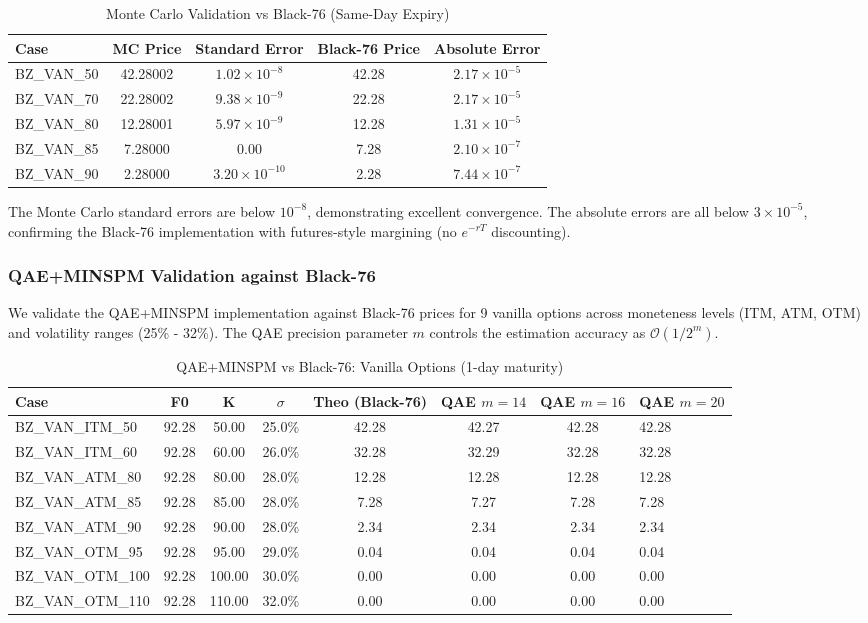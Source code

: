 \documentclass[12pt]{article}
\begin{document}
\begin{table}[H]
\centering
\begin{tabular}{lcccc}
\toprule
Case & MC Price & Standard Error & Black-76 Price & Absolute Error \\
\midrule
BZ\_VAN\_50 & 42.28002 & $1.02 \times 10^{-8}$ & 42.28 & $2.17 \times 10^{-5}$ \\
BZ\_VAN\_70 & 22.28002 & $9.38 \times 10^{-9}$ & 22.28 & $2.17 \times 10^{-5}$ \\
BZ\_VAN\_80 & 12.28001 & $5.97 \times 10^{-9}$ & 12.28 & $1.31 \times 10^{-5}$ \\
BZ\_VAN\_85 & 7.28000 & $0.00$ & 7.28 & $2.10 \times 10^{-7}$ \\
BZ\_VAN\_90 & 2.28000 & $3.20 \times 10^{-10}$ & 2.28 & $7.44 \times 10^{-7}$ \\
\bottomrule
\end{tabular}
\caption{Monte Carlo Validation vs Black-76 (Same-Day Expiry)}
\end{table}

The Monte Carlo standard errors are below $10^{-8}$, demonstrating excellent convergence. The absolute errors are all below $3 \times 10^{-5}$, confirming the Black-76 implementation with futures-style margining (no $e^{-rT}$ discounting).

\subsubsection{QAE+MINSPM Validation against Black-76}

We validate the QAE+MINSPM implementation against Black-76 prices for 9 vanilla options across moneteness levels (ITM, ATM, OTM) and volatility ranges (25\% - 32\%). The QAE precision parameter $m$ controls the estimation accuracy as $\mathcal{O}(1/2^m)$.

\begin{table}[H]
\centering
\begin{tabular}{lcccccc}
\toprule
Case & F0 & K & $\sigma$ & Theo (Black-76) & QAE $m=14$ & QAE $m=16$ & QAE $m=20$ \\
\midrule
BZ\_VAN\_ITM\_50 & 92.28 & 50.00 & 25.0\% & 42.28 & 42.27 & 42.28 & 42.28 \\
BZ\_VAN\_ITM\_60 & 92.28 & 60.00 & 26.0\% & 32.28 & 32.29 & 32.28 & 32.28 \\
BZ\_VAN\_ATM\_80 & 92.28 & 80.00 & 28.0\% & 12.28 & 12.28 & 12.28 & 12.28 \\
BZ\_VAN\_ATM\_85 & 92.28 & 85.00 & 28.0\% & 7.28 & 7.27 & 7.28 & 7.28 \\
BZ\_VAN\_ATM\_90 & 92.28 & 90.00 & 28.0\% & 2.34 & 2.34 & 2.34 & 2.34 \\
BZ\_VAN\_OTM\_95 & 92.28 & 95.00 & 29.0\% & 0.04 & 0.04 & 0.04 & 0.04 \\
BZ\_VAN\_OTM\_100 & 92.28 & 100.00 & 30.0\% & 0.00 & 0.00 & 0.00 & 0.00 \\
BZ\_VAN\_OTM\_110 & 92.28 & 110.00 & 32.0\% & 0.00 & 0.00 & 0.00 & 0.00 \\
\bottomrule
\end{tabular}
\caption{QAE+MINSPM vs Black-76: Vanilla Options (1-day maturity)}
\end{table}
\end{document}
